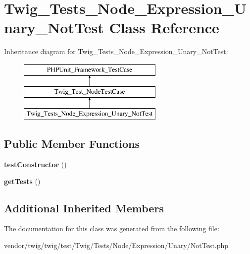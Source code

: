 \hypertarget{classTwig__Tests__Node__Expression__Unary__NotTest}{}\section{Twig\+\_\+\+Tests\+\_\+\+Node\+\_\+\+Expression\+\_\+\+Unary\+\_\+\+Not\+Test Class Reference}
\label{classTwig__Tests__Node__Expression__Unary__NotTest}
Inheritance diagram for Twig\+\_\+\+Tests\+\_\+\+Node\+\_\+\+Expression\+\_\+\+Unary\+\_\+\+Not\+Test\+:\begin{figure}[H]
\begin{center}
\leavevmode
\includegraphics[height=3.000000cm]{classTwig__Tests__Node__Expression__Unary__NotTest}
\end{center}
\end{figure}
\subsection*{Public Member Functions}
\begin{DoxyCompactItemize}
\item 
{\bfseries test\+Constructor} ()\hypertarget{classTwig__Tests__Node__Expression__Unary__NotTest_ac83d8780c257c6c7d5d46696df8ad9f7}{}\label{classTwig__Tests__Node__Expression__Unary__NotTest_ac83d8780c257c6c7d5d46696df8ad9f7}

\item 
{\bfseries get\+Tests} ()\hypertarget{classTwig__Tests__Node__Expression__Unary__NotTest_afb7749ba6cae942c9fef2d8cb8541568}{}\label{classTwig__Tests__Node__Expression__Unary__NotTest_afb7749ba6cae942c9fef2d8cb8541568}

\end{DoxyCompactItemize}
\subsection*{Additional Inherited Members}


The documentation for this class was generated from the following file\+:\begin{DoxyCompactItemize}
\item 
vendor/twig/twig/test/\+Twig/\+Tests/\+Node/\+Expression/\+Unary/Not\+Test.\+php\end{DoxyCompactItemize}
